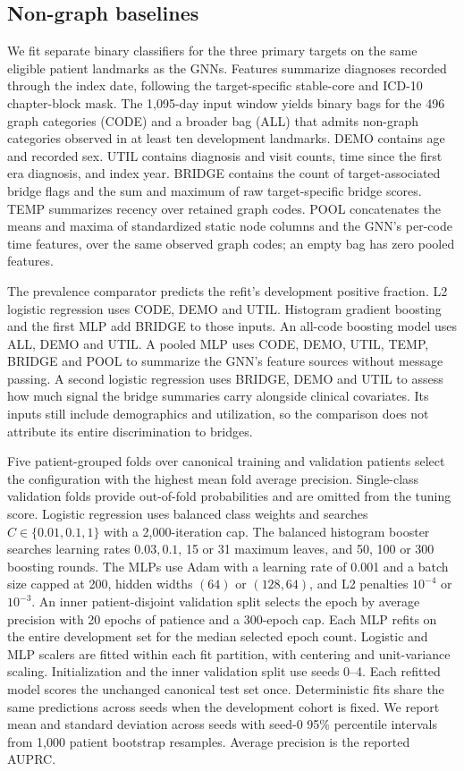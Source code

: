 \subsection{Non-graph baselines}
We fit separate binary classifiers for the three primary targets on the same eligible patient landmarks as the GNNs. Features summarize diagnoses recorded through the index date, following the target-specific stable-core and ICD-10 chapter-block mask. The 1,095-day input window yields binary bags for the 496 graph categories (CODE) and a broader bag (ALL) that admits non-graph categories observed in at least ten development landmarks. DEMO contains age and recorded sex. UTIL contains diagnosis and visit counts, time since the first era diagnosis, and index year. BRIDGE contains the count of target-associated bridge flags and the sum and maximum of raw target-specific bridge scores. TEMP summarizes recency over retained graph codes. POOL concatenates the means and maxima of standardized static node columns and the GNN's per-code time features, over the same observed graph codes; an empty bag has zero pooled features.

The prevalence comparator predicts the refit's development positive fraction. L2 logistic regression uses CODE, DEMO and UTIL. Histogram gradient boosting and the first MLP add BRIDGE to those inputs. An all-code boosting model uses ALL, DEMO and UTIL. A pooled MLP uses CODE, DEMO, UTIL, TEMP, BRIDGE and POOL to summarize the GNN's feature sources without message passing. A second logistic regression uses BRIDGE, DEMO and UTIL to assess how much signal the bridge summaries carry alongside clinical covariates. Its inputs still include demographics and utilization, so the comparison does not attribute its entire discrimination to bridges.

Five patient-grouped folds over canonical training and validation patients select the configuration with the highest mean fold average precision. Single-class validation folds provide out-of-fold probabilities and are omitted from the tuning score. Logistic regression uses balanced class weights and searches \(C \in \{0.01,0.1,1\}\) with a 2,000-iteration cap. The balanced histogram booster searches learning rates \(0.03,0.1\), 15 or 31 maximum leaves, and 50, 100 or 300 boosting rounds. The MLPs use Adam with a learning rate of 0.001 and a batch size capped at 200, hidden widths \((64)\) or \((128,64)\), and L2 penalties \(10^{-4}\) or \(10^{-3}\). An inner patient-disjoint validation split selects the epoch by average precision with 20 epochs of patience and a 300-epoch cap. Each MLP refits on the entire development set for the median selected epoch count. Logistic and MLP scalers are fitted within each fit partition, with centering and unit-variance scaling. Initialization and the inner validation split use seeds 0--4. Each refitted model scores the unchanged canonical test set once. Deterministic fits share the same predictions across seeds when the development cohort is fixed. We report mean and standard deviation across seeds with seed-0 95\% percentile intervals from 1,000 patient bootstrap resamples. Average precision is the reported AUPRC.

